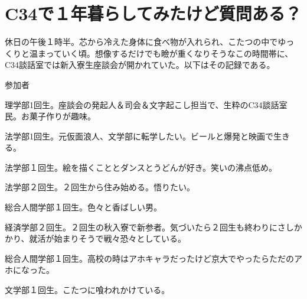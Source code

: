 \section{C34で１年暮らしてみたけど質問ある？}
休日の午後１時半。芯から冷えた身体に食べ物が入れられ、こたつの中でゆっくりと温まっていく頃。想像するだけでも瞼が重くなりそうなこの時間帯に、C34談話室では新入寮生座談会が開かれていた。以下はその記録である。
\vspace{3mm}


\begin{itembox}[l]{\LARGE 参加者}

理学部1回生。座談会の発起人＆司会＆文字起こし担当で、生粋のC34談話室民。お菓子作りが趣味。


法学部1回生。元仮面浪人、文学部に転学したい。ビールと爆発と映画で生きる。


法学部１回生。絵を描くこととダンスとうどんが好き。笑いの沸点低め。


法学部２回生。２回生から住み始める。悟りたい。


総合人間学部１回生。色々と香ばしい男。


経済学部２回生。２回生の秋入寮で新参者。気づいたら２回生も終わりにさしかかり、就活が始まりそうで戦々恐々としている。


総合人間学部１回生。高校の時はアホキャラだったけど京大でやったらただのアホになった。


文学部１回生。こたつに喰われかけている。

\end{itembox}
